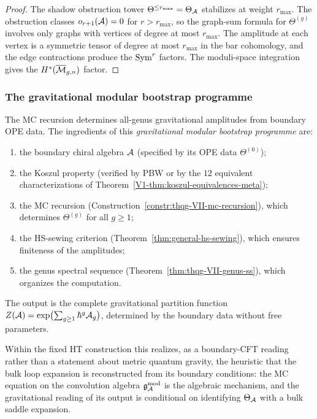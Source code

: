 \begin{proof}
The shadow obstruction tower $\Theta^{\leq r_{\max}} = \Theta_{\mathcal{A}}$
stabilizes at weight $r_{\max}$. The obstruction classes
$o_{r+1}(\mathcal{A}) = 0$ for $r > r_{\max}$, so the graph-sum
formula for $\Theta^{(g)}$ involves only graphs with vertices
of degree at most $r_{\max}$. The amplitude at each vertex is
a symmetric tensor of degree at most $r_{\max}$ in the bar
cohomology, and the edge contractions produce the $\operatorname{Sym}^r$
factors. The moduli-space integration gives the
$H^*(\overline{\mathcal{M}}_{g,n})$ factor.
\end{proof}

\subsubsection{The gravitational modular bootstrap programme}

\begin{remark}
The MC recursion determines all-genus gravitational amplitudes
from boundary OPE data. The ingredients of this
\emph{gravitational modular bootstrap programme} are:
\begin{enumerate}[label=(\arabic*)]
\item the boundary chiral algebra $\mathcal{A}$ (specified by its
 OPE data $\Theta^{(0)}$);
\item the Koszul property (verified by PBW or by the $12$
 equivalent characterizations of
 Theorem~\ref*{V1-thm:koszul-equivalences-meta});
\item the MC recursion
 (Construction~\ref{constr:thqg-VII-mc-recursion}), which
 determines $\Theta^{(g)}$ for all $g \geq 1$;
\item the HS-sewing criterion
 (Theorem~\ref{thm:general-hs-sewing}), which ensures
 finiteness of the amplitudes;
\item the genus spectral sequence
 (Theorem~\ref{thm:thqg-VII-genus-ss}), which organizes
 the computation.
\end{enumerate}
The output is the complete gravitational partition function
$Z(\mathcal{A}) = \exp\bigl(\sum_{g \geq 1} \hbar^g \mathcal{A}_g\bigr)$,
determined by the boundary data without free parameters.

Within the fixed HT construction this realizes, as a boundary-CFT
reading rather than a statement about metric quantum gravity, the
heuristic that the bulk loop expansion is reconstructed from its
boundary conditions: the MC equation on the convolution algebra
$\mathfrak{g}_{\mathcal{A}}^{\mathrm{mod}}$ is the algebraic mechanism, and the gravitational reading of
its output is conditional on identifying $\Theta_{\mathcal{A}}$ with a bulk
saddle expansion.
\end{remark}

